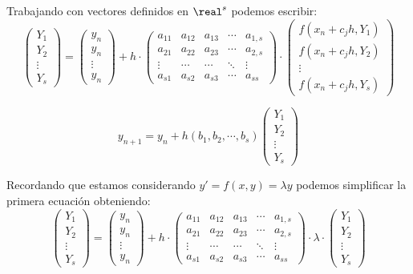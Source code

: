 Trabajando con vectores definidos en $\real^s$ podemos escribir:
\[\left(\begin{array}{c}
Y_1 \\
Y_2 \\
\vdots \\
Y_s
\end{array}\right) = \left(\begin{array}{c}
y_n \\
y_n \\
\vdots \\
y_n
\end{array}\right) +h\cdot \left(\begin{array}{ccccc}
a_{11} & a_{12} & a_{13} & \cdots & a_{1,s}\\
a_{21} & a_{22} & a_{23} & \cdots & a_{2,s}\\
\vdots & \cdots & \cdots & \ddots & \vdots \\
a_{s1} & a_{s2} & a_{s3} & \cdots & a_{ss}
\end{array}\right) \cdot \left( \begin{array}{c} f(x_n+c_jh, Y_1) \\ f(x_n+c_jh, Y_2) \\ \vdots \\ f(x_n+c_jh, Y_s)\end{array}\right)\]

\[y_{n+1}=y_n+h\left(b_1,b_2, \cdots, b_s \right)\left(\begin{array}{c}
Y_1 \\
Y_2 \\
\vdots \\
Y_s
\end{array}\right)\]

Recordando que estamos considerando $y'=f(x,y)=λy$ podemos simplificar la primera ecuación obteniendo:
\[\left(\begin{array}{c}
Y_1 \\
Y_2 \\
\vdots \\
Y_s
\end{array}\right) = \left(\begin{array}{c}
y_n \\
y_n \\
\vdots \\
y_n
\end{array}\right) +h\cdot \left(\begin{array}{ccccc}
a_{11} & a_{12} & a_{13} & \cdots & a_{1,s}\\
a_{21} & a_{22} & a_{23} & \cdots & a_{2,s}\\
\vdots & \cdots & \cdots & \ddots & \vdots \\
a_{s1} & a_{s2} & a_{s3} & \cdots & a_{ss}
\end{array}\right) \cdot λ \cdot \left(\begin{array}{c}
Y_1 \\
Y_2 \\
\vdots \\
Y_s
\end{array}\right)\]

